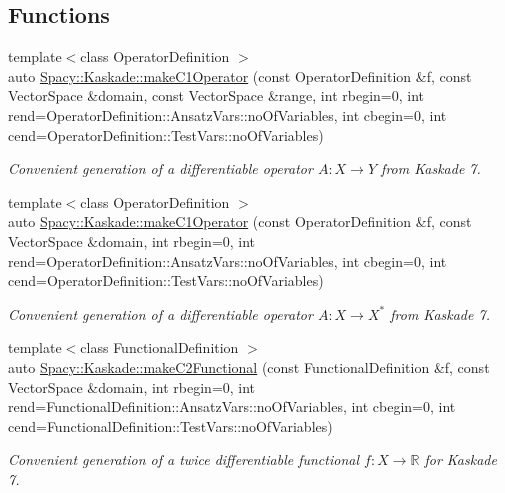 \subsection*{Functions}
\begin{DoxyCompactItemize}
\item 
{\footnotesize template$<$class Operator\+Definition $>$ }\\auto \hyperlink{group__KaskadeGroup_gae521d64422967ee3679b8e5bc26de996_gae521d64422967ee3679b8e5bc26de996}{Spacy\+::\+Kaskade\+::make\+C1\+Operator} (const Operator\+Definition \&f, const Vector\+Space \&domain, const Vector\+Space \&range, int rbegin=0, int rend=Operator\+Definition\+::\+Ansatz\+Vars\+::no\+Of\+Variables, int cbegin=0, int cend=Operator\+Definition\+::\+Test\+Vars\+::no\+Of\+Variables)
\begin{DoxyCompactList}\small\item\em Convenient generation of a differentiable operator $A: X\rightarrow Y$ from Kaskade 7. \end{DoxyCompactList}\item 
{\footnotesize template$<$class Operator\+Definition $>$ }\\auto \hyperlink{group__KaskadeGroup_ga8af78a452fabadde5f03fc4dc56face8_ga8af78a452fabadde5f03fc4dc56face8}{Spacy\+::\+Kaskade\+::make\+C1\+Operator} (const Operator\+Definition \&f, const Vector\+Space \&domain, int rbegin=0, int rend=Operator\+Definition\+::\+Ansatz\+Vars\+::no\+Of\+Variables, int cbegin=0, int cend=Operator\+Definition\+::\+Test\+Vars\+::no\+Of\+Variables)
\begin{DoxyCompactList}\small\item\em Convenient generation of a differentiable operator $A: X\rightarrow X^*$ from Kaskade 7. \end{DoxyCompactList}\item 
{\footnotesize template$<$class Functional\+Definition $>$ }\\auto \hyperlink{group__KaskadeGroup_gacef43eab636b05ddcfb7768041a2bc0e_gacef43eab636b05ddcfb7768041a2bc0e}{Spacy\+::\+Kaskade\+::make\+C2\+Functional} (const Functional\+Definition \&f, const Vector\+Space \&domain, int rbegin=0, int rend=Functional\+Definition\+::\+Ansatz\+Vars\+::no\+Of\+Variables, int cbegin=0, int cend=Functional\+Definition\+::\+Test\+Vars\+::no\+Of\+Variables)
\begin{DoxyCompactList}\small\item\em Convenient generation of a twice differentiable functional $f: X\rightarrow \mathbb{R}$ for Kaskade 7. \end{DoxyCompactList}\item 

\end{DoxyCompactItemize}
